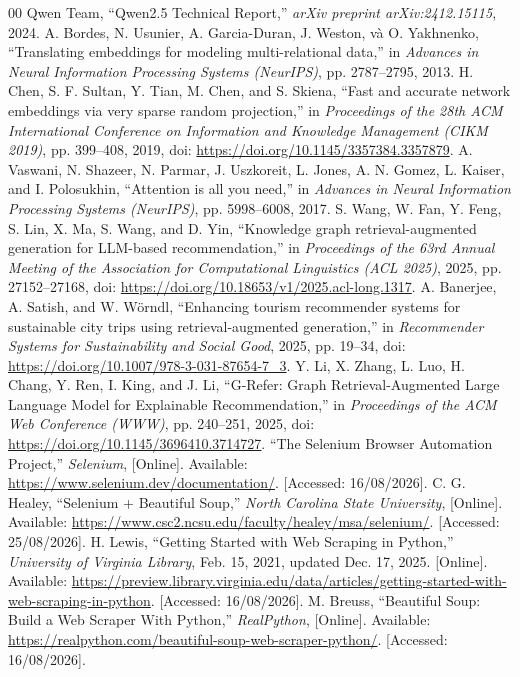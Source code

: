 \documentclass[journal,onecolumn,10pt]{IEEEtran}
\begin{document}
\begin{thebibliography}{00}
 Qwen Team, ``Qwen2.5 Technical Report,'' \textit{arXiv preprint arXiv:2412.15115}, 2024.
 A. Bordes, N. Usunier, A. Garcia-Duran, J. Weston, và O. Yakhnenko, ``Translating embeddings for modeling multi-relational data,'' in \textit{Advances in Neural Information Processing Systems (NeurIPS)}, pp. 2787--2795, 2013.
 H. Chen, S. F. Sultan, Y. Tian, M. Chen, and S. Skiena, ``Fast and accurate network embeddings via very sparse random projection,'' in \textit{Proceedings of the 28th ACM International Conference on Information and Knowledge Management (CIKM 2019)}, pp. 399--408, 2019, doi: \url{https://doi.org/10.1145/3357384.3357879}.
 A. Vaswani, N. Shazeer, N. Parmar, J. Uszkoreit, L. Jones, A. N. Gomez, L. Kaiser, and I. Polosukhin, ``Attention is all you need,'' in \textit{Advances in Neural Information Processing Systems (NeurIPS)}, pp. 5998--6008, 2017.
 S. Wang, W. Fan, Y. Feng, S. Lin, X. Ma, S. Wang, and D. Yin, ``Knowledge graph retrieval-augmented generation for LLM-based recommendation,'' in \textit{Proceedings of the 63rd Annual Meeting of the Association for Computational Linguistics (ACL 2025)}, 2025, pp. 27152--27168, doi: \url{https://doi.org/10.18653/v1/2025.acl-long.1317}.
 A. Banerjee, A. Satish, and W. W\"orndl, ``Enhancing tourism recommender systems for sustainable city trips using retrieval-augmented generation,'' in \textit{Recommender Systems for Sustainability and Social Good}, 2025, pp. 19--34, doi: \url{https://doi.org/10.1007/978-3-031-87654-7_3}.
 Y. Li, X. Zhang, L. Luo, H. Chang, Y. Ren, I. King, and J. Li, ``G-Refer: Graph Retrieval-Augmented Large Language Model for Explainable Recommendation,'' in \textit{Proceedings of the ACM Web Conference (WWW)}, pp. 240--251, 2025, doi: \url{https://doi.org/10.1145/3696410.3714727}.
 ``The Selenium Browser Automation Project,'' \textit{Selenium}, [Online]. Available: \url{https://www.selenium.dev/documentation/}. [Accessed: 16/08/2026].
 C. G. Healey, ``Selenium + Beautiful Soup,'' \textit{North Carolina State University}, [Online]. Available: \url{https://www.csc2.ncsu.edu/faculty/healey/msa/selenium/}. [Accessed: 25/08/2026].
 H. Lewis, ``Getting Started with Web Scraping in Python,'' \textit{University of Virginia Library}, Feb. 15, 2021, updated Dec. 17, 2025. [Online]. Available: \url{https://preview.library.virginia.edu/data/articles/getting-started-with-web-scraping-in-python}. [Accessed: 16/08/2026].
 M. Breuss, ``Beautiful Soup: Build a Web Scraper With Python,'' \textit{RealPython}, [Online]. Available: \url{https://realpython.com/beautiful-soup-web-scraper-python/}. [Accessed: 16/08/2026].

\end{thebibliography}
\end{document}
